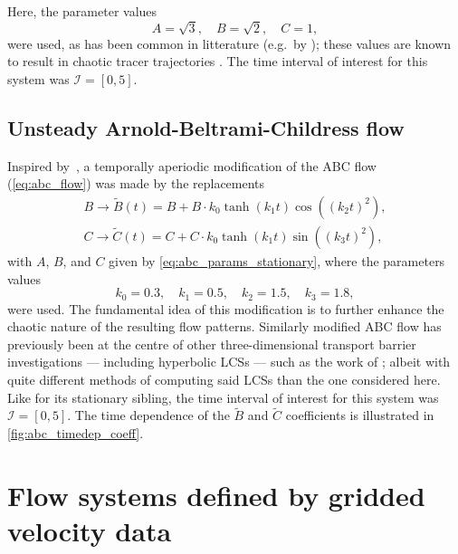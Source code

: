 Here, the parameter values
\begin{equation}
    \label{eq:abc_params_stationary}
    A = \sqrt{3},\quad B = \sqrt{2},\quad C = 1,
\end{equation}
were used, as has been common in litterature (e.g.\ by
\textcite{oettinger2016autonomous}); these values are known to result in
chaotic tracer trajectories \parencite{zhao1993chaotic}. The time interval of
interest for this system was $\mathcal{I}=[0,5]$.

\subsection{Unsteady Arnold-Beltrami-Childress flow}%
\label{sub:unsteady_arnold_beltrami_childress_flow}

Inspired by~\textcite{oettinger2016autonomous}, a temporally aperiodic
modification of the ABC flow (\cref{eq:abc_flow}) was made by the replacements
\begin{equation}
    \label{eq:abc_params_nonstationary}
    \begin{gathered}
    B\to{}\widetilde{B}(t) = B + B\cdot{}k_{0}\tanh(k_{1}t)\cos({({k_{2}t})}^{2}),\\
    C\to{}\widetilde{C}(t) = C + C\cdot{}k_{0}\tanh(k_{1}t)\sin({({k_{3}t})}^{2}),
    \end{gathered}
\end{equation}
with $A$, $B$, and $C$ given by \cref{eq:abc_params_stationary}, where the
parameters values
\begin{equation}
    \label{eq:abc_params_nonstationary_frequencies}
    k_{0}=0.3,\quad k_{1}=0.5,\quad k_{2}=1.5,\quad k_{3}=1.8,
\end{equation}
were used. The fundamental idea of this modification is to further enhance
the chaotic nature of the resulting flow patterns. Similarly modified
ABC flow has previously been at the centre of other three-dimensional transport
barrier investigations --- including hyperbolic LCSs --- such as the work of
\textcite{blazevski2014hyperbolic}; albeit with quite different methods of
computing said LCSs than the one considered here. Like for its stationary
sibling, the time interval of interest for this system was $\mathcal{I}=[0,5]$.
The time dependence of the $\widetilde{B}$ and  $\widetilde{C}$ coefficients is
illustrated in \cref{fig:abc_timedep_coeff}.



\section{Flow systems defined by gridded velocity data}
\label{sec:flow_systems_defined_by_gridded_velocity_data}

